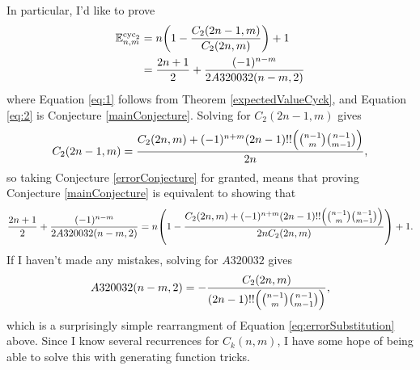\documentclass{article}
\let\originalleft\left
\let\originalright\right
\renewcommand{\left}{\mathopen{}\mathclose\bgroup\originalleft}
\renewcommand{\right}{\aftergroup\egroup\originalright}
\numberwithin{equation}{subsection}
\begin{document}
In particular, I'd like to prove \begin{align}
  \mathbb{E}_{n,m}^{\text{cyc}_2}
  &= n\left(1 - \frac{C_2(2n - 1, m)}{C_2(2n, m)}\right) + 1 \label{eq:1}\\
  &= \frac{2n+1}{2} + \frac{(-1)^{n-m}}{2 A320032(n - m, 2)} \label{eq:2}
\end{align} where Equation \ref{eq:1} follows from Theorem \ref{expectedValueCyck},
and Equation \ref{eq:2} is Conjecture \ref{mainConjecture}.
Solving for $C_2(2n-1,m)$ gives \begin{equation}
  C_2(2n-1,m) = \frac{C_2(2n, m) + (-1)^{n + m}(2n - 1)!!\left(\binom{n-1}{m}\binom{n-1}{m-1}\right)}{2n},
\end{equation}
so taking Conjecture \ref{errorConjecture} for granted, means that proving
Conjecture \ref{mainConjecture} is equivalent to showing that \begin{equation}
  \frac{2n+1}{2} + \frac{(-1)^{n-m}}{2 A320032(n - m, 2)} = n\left(1 - \frac{C_2(2n, m) + (-1)^{n + m}(2n - 1)!!\left(\binom{n-1}{m}\binom{n-1}{m-1}\right)}{2nC_2(2n, m)}\right) + 1.
  \label{eq:errorSubstitution}
\end{equation}
If I haven't made any mistakes, solving for $A320032$ gives
\begin{equation}
  A320032(n - m, 2) = -\frac{C_2(2n, m)}{(2n - 1)!!\left(\binom{n-1}{m}\binom{n-1}{m-1}\right)},
\end{equation}
which is a surprisingly simple rearrangment of
Equation \ref{eq:errorSubstitution} above. Since I know several recurrences for
$C_k(n, m)$, I have some hope of being able to solve this with generating
function tricks.
\end{document}
